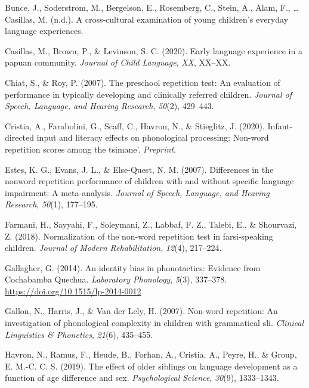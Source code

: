 \documentclass[english,,man,floatsintext]{apa6}
\begin{document}
\leavevmode\hypertarget{ref-bunceURcrosscultural}{}%
Bunce, J., Soderstrom, M., Bergelson, E., Rosemberg, C., Stein, A., Alam, F., \ldots{} Casillas, M. (n.d.). A cross-cultural examination of young children's everyday language experiences.

\leavevmode\hypertarget{ref-casillas2020early}{}%
Casillas, M., Brown, P., \& Levinson, S. C. (2020). Early language experience in a papuan community. \emph{Journal of Child Language}, \emph{XX}, XX--XX.

\leavevmode\hypertarget{ref-chiat2007preschool}{}%
Chiat, S., \& Roy, P. (2007). The preschool repetition test: An evaluation of performance in typically developing and clinically referred children. \emph{Journal of Speech, Language, and Hearing Research}, \emph{50}(2), 429--443.

\leavevmode\hypertarget{ref-cristia2020infant}{}%
Cristia, A., Farabolini, G., Scaff, C., Havron, N., \& Stieglitz, J. (2020). Infant-directed input and literacy effects on phonological processing: Non-word repetition scores among the tsimane'. \emph{Preprint}.

\leavevmode\hypertarget{ref-estes2007differences}{}%
Estes, K. G., Evans, J. L., \& Else-Quest, N. M. (2007). Differences in the nonword repetition performance of children with and without specific language impairment: A meta-analysis. \emph{Journal of Speech, Language, and Hearing Research}, \emph{50}(1), 177--195.

\leavevmode\hypertarget{ref-farmani2018normalization}{}%
Farmani, H., Sayyahi, F., Soleymani, Z., Labbaf, F. Z., Talebi, E., \& Shourvazi, Z. (2018). Normalization of the non-word repetition test in farsi-speaking children. \emph{Journal of Modern Rehabilitation}, \emph{12}(4), 217--224.

\leavevmode\hypertarget{ref-gallagher2014identity}{}%
Gallagher, G. (2014). An identity bias in phonotactics: Evidence from Cochabamba Quechua. \emph{Laboratory Phonology}, \emph{5}(3), 337--378. \url{https://doi.org/10.1515/lp-2014-0012}

\leavevmode\hypertarget{ref-gallon2007non}{}%
Gallon, N., Harris, J., \& Van der Lely, H. (2007). Non-word repetition: An investigation of phonological complexity in children with grammatical sli. \emph{Clinical Linguistics \& Phonetics}, \emph{21}(6), 435--455.

\leavevmode\hypertarget{ref-havron2019effect}{}%
Havron, N., Ramus, F., Heude, B., Forhan, A., Cristia, A., Peyre, H., \& Group, E. M.-C. C. S. (2019). The effect of older siblings on language development as a function of age difference and sex. \emph{Psychological Science}, \emph{30}(9), 1333--1343.
\end{document}
